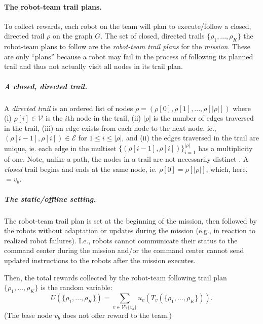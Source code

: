 \documentclass[11pt, oneside]{article}
\begin{document}
\paragraph{The robot-team trail plans.}
To collect rewards, each robot on the team will plan to execute/follow a closed, directed trail $\rho$ on the graph $G$.  
The set of closed, directed trails $\{\rho_1, ..., \rho_K\}$ the robot-team plans to follow are the \emph{robot-team trail plans} for the \emph{mission}. These are only ``plans'' because a robot may fail in the process of following its planned trail and thus not actually visit all nodes in its trail plan.

\vspace{-\baselineskip}
\subparagraph{A closed, directed trail.} 
A \emph{directed trail} is an ordered list of nodes $\rho = (\rho[0], \rho[1], ..., \rho[\lvert \rho \rvert])$ where
(i) $\rho[i] \in \mathcal{V}$ is the $i$th node in the trail,  
(ii) $\lvert \rho \rvert$ is the number of edges traversed in the trail,
(iii) an edge exists from each node to the next node, ie., $(\rho[i-1], \rho[i])\in\mathcal{E}$ for $1 \leq i  \leq \lvert \rho \rvert$,
and 
(ii) the edges traversed in the trail are unique, ie. each edge in the multiset $\{(\rho[i-1], \rho[i])\}_{i=1}^{\lvert \rho \rvert}$ has a multiplicity of one.
Note, unlike a path, the nodes in a trail are not necessarily distinct \cite{wilson1979introduction}.
A \emph{closed} trail begins and ends at the same node, ie. $\rho [0]=\rho[\lvert \rho \rvert]$, which, here, $=v_b$.

\vspace{-\baselineskip}
\subparagraph{The static/offline setting.} 
The robot-team trail plan is set at the beginning of the mission, then followed by the robots without adaptation or updates during the mission (e.g., in reaction to realized robot failures). 
I.e., robots cannot communicate their status to the command center during the mission and/or the command center cannot send updated instructions to the robots after the mission executes.






Then, the total rewards collected by the robot-team following trail plan $\{\rho_1, ..., \rho_K\}$ is the random variable:
\begin{equation}
U(\{\rho_1,...,\rho_K\}) = \sum_{v\in\mathcal{V}\setminus \{v_b\}} u_v\left ( T_v(\{\rho_1, ..., \rho_K\}) \right).
\end{equation}
(The base node $v_b$ does not offer reward to the team.)
\end{document}

